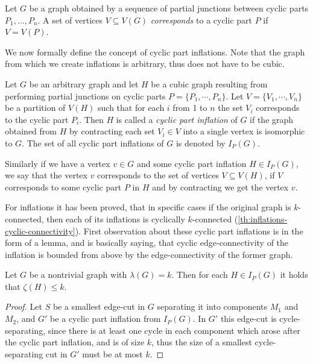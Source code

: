 \documentclass[12pt, twoside]{book}
\begin{document}
Let $G$ be a graph obtained by a sequence of partial junctions between cyclic parts $P_1,\dots,P_n$. A set of vertices $V\subseteq V(G)$ \textit{corresponds} to a cyclic part $P$ if $V=V(P)$.

We now formally define the concept of cyclic part inflations. Note that the graph from which we create inflations is arbitrary, thus does not have to be cubic.

\begin{definition}
	\label{def:cyclic-part-inflation}
	Let $G$ be an arbitrary graph and let $H$ be a cubic graph resulting from performing partial junctions on cyclic parts $P=\{P_1,\cdots,P_n\}$. Let $V=\{V_1,\cdots, V_n\}$ be a partition of $V(H)$ such that for each $i$ from 1 to $n$ the set $V_i$ corresponds to the cyclic part $P_i$. Then $H$ is called a \textit{cyclic part inflation} of $G$ if the graph obtained from $H$ by contracting each set $V_i\in V$ into a single vertex is isomorphic to $G$. The set of all cyclic part inflations of $G$ is denoted by $I_P(G)$.
\end{definition}

Similarly if we have a vertex $v\in G$ and some cyclic part inflation $H\in I_P(G)$, we say that the vertex $v$ corresponds to the set of vertices $V\subseteq V(H)$, if $V$ corresponds to some cyclic part $P$ in $H$ and by contracting we get the vertex $v$.

For inflations it has been proved, that in specific cases if the original graph is $k$-connected, then each of its inflations is cyclically $k$-connected (\cref{th:inflations-cyclic-connectivity}). First observation about these cyclic part inflations is in the form of a lemma, and is basically saying, that cyclic edge-connectivity of the inflation is bounded from above by the edge-connectivity of the former graph.

\begin{lemma}
	Let $G$ be a nontrivial graph with $\lambda(G)=k$. Then for each $H\in I_P(G)$ it holds that $\zeta(H)\leq k$.
\end{lemma}

\begin{proof}
	Let $S$ be a smallest edge-cut in $G$ separating it into components $M_1$ and $M_2$, and $G'$ be a cyclic part inflation from $I_P(G)$. In $G'$ this edge-cut is cycle-separating, since there is at least one cycle in each component which arose after the cyclic part inflation, and is of size $k$, thus the size of a smallest cycle-separating cut in $G'$ must be at most $k$.
\end{proof}
\end{document}
